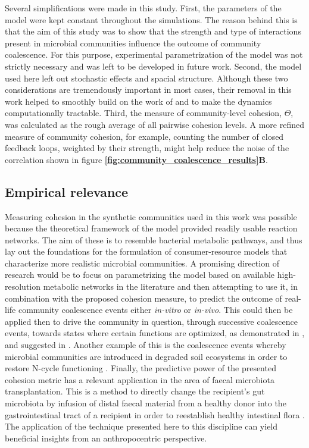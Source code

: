 \documentclass[titlepage,11pt]{article}
\begin{document}
\begin{linenumbers}
			Several simplifications were made in this study. First, the parameters of the model were kept constant throughout the simulations. The reason behind this is that the aim of this study was to show that the strength and type of interactions present in microbial communities influence the outcome of community coalescence. For this purpose, experimental parametrization of the model was not strictly necessary and was left to be developed in future work. Second, the model used here left out stochastic effects and spacial structure. Although these two considerations are tremendously important in most cases, their removal in this work helped to smoothly build on the work of \citet{Tikhonov2016} and to make the dynamics computationally tractable. Third, the measure of community-level cohesion, $ \Theta $, was calculated as the rough average of all pairwise cohesion levels. A more refined measure of community cohesion, for example, counting the number of closed feedback loops, weighted by their strength,  might help reduce the noise of the correlation shown in figure \textbf{\ref{fig:community_coalescence_results}B}. %
			\subsection{Empirical relevance}
				\hspace{15pt}Measuring cohesion in the synthetic communities used in this work was possible because the theoretical framework of the model provided readily usable reaction networks. The aim of these is to resemble bacterial metabolic pathways, and thus lay out the foundations for the formulation of consumer-resource models that characterize more realistic microbial communities. A promising direction of research would be to focus on parametrizing the model based on available high-resolution metabolic networks in the literature and then attempting to use it, in combination with the proposed cohesion measure, to predict the outcome of real-life community coalescence events either \textit{in-vitro} or \textit{in-vivo}. This could then be applied then to drive the community in question, through successive coalescence events, towards states where certain functions are optimized, as demonstrated in \citet{Sierocinski2017}, and suggested in \citet{Rillig2016}. Another example of this is the coalescence events whereby microbial communities are introduced in degraded soil ecosystems in order to restore N-cycle functioning \citep{Calderon2017}. Finally, the predictive power of the presented cohesion metric has a relevant application in the area of faecal microbiota transplantation. This is a method to directly change the recipient's gut microbiota by infusion of distal faecal material from a healthy donor into the gastrointestinal tract of a recipient in order to reestablish healthy intestinal flora \citep{Wang2019, Wilson2019}. The application of the technique presented here to this discipline can yield beneficial insights from an anthropocentric perspective. 

\end{linenumbers}
\end{document}
